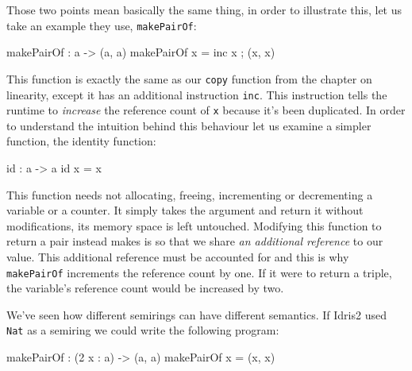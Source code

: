\documentclass[
]{article}
\newenvironment{Shaded}{}{}
\newcommand{\DecValTok}[1]{\textcolor[rgb]{0.25,0.63,0.44}{#1}}
\newcommand{\FunctionTok}[1]{\textcolor[rgb]{0.02,0.16,0.49}{#1}}
\newcommand{\NormalTok}[1]{#1}
\newcommand{\OperatorTok}[1]{\textcolor[rgb]{0.40,0.40,0.40}{#1}}
\newcommand{\OtherTok}[1]{\textcolor[rgb]{0.00,0.44,0.13}{#1}}
\begin{document}
Those two points mean basically the same thing, in order to illustrate
this, let us take an example they use, \texttt{makePairOf}:

\begin{Shaded}
\begin{Highlighting}[]
\NormalTok{makePairOf }\OperatorTok{:}\NormalTok{ a }\OtherTok{{-}\textgreater{}}\NormalTok{ (a, a)}
\NormalTok{makePairOf x }\OtherTok{=}\NormalTok{ inc x ; (x, x)}
\end{Highlighting}
\end{Shaded}

This function is exactly the same as our \texttt{copy} function from the
chapter on linearity, except it has an additional instruction
\texttt{inc}. This instruction tells the runtime to \emph{increase} the
reference count of \texttt{x} because it's been duplicated. In order to
understand the intuition behind this behaviour let us examine a simpler
function, the identity function:

\begin{Shaded}
\begin{Highlighting}[]
\FunctionTok{id} \OperatorTok{:}\NormalTok{ a }\OtherTok{{-}\textgreater{}}\NormalTok{ a}
\FunctionTok{id}\NormalTok{ x }\OtherTok{=}\NormalTok{ x}
\end{Highlighting}
\end{Shaded}

This function needs not allocating, freeing, incrementing or
decrementing a variable or a counter. It simply takes the argument and
return it without modifications, its memory space is left untouched.
Modifying this function to return a pair instead makes is so that we
share \emph{an additional reference} to our value. This additional
reference must be accounted for and this is why \texttt{makePairOf}
increments the reference count by one. If it were to return a triple,
the variable's reference count would be increased by two.

We've seen how different semirings can have different semantics. If
Idris2 used \texttt{Nat} as a semiring we could write the following
program:

\begin{Shaded}
\begin{Highlighting}[]
\NormalTok{makePairOf }\OperatorTok{:}\NormalTok{ (}\DecValTok{2}\NormalTok{ x }\OperatorTok{:}\NormalTok{ a) }\OtherTok{{-}\textgreater{}}\NormalTok{ (a, a)}
\NormalTok{makePairOf x }\OtherTok{=}\NormalTok{ (x, x)}
\end{Highlighting}
\end{Shaded}
\end{document}

